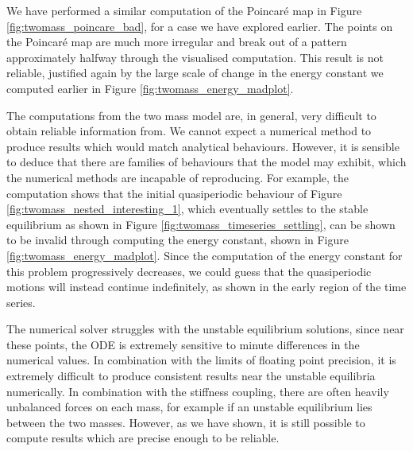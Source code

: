 \documentclass{article}
\begin{document}
We have performed a similar computation of the Poincar\'e map in Figure \ref{fig:twomass_poincare_bad},
for a case we have explored earlier.
The points on the Poincar\'e map are much more irregular and break out of a pattern approximately halfway through the visualised computation.
This result is not reliable, justified again by the large scale of change in the energy constant we computed earlier in Figure \ref{fig:twomass_energy_madplot}.

The computations from the two mass model are, in general, very difficult to obtain reliable information from.
We cannot expect a numerical method to produce results which would match analytical behaviours.
However, it is sensible to deduce that there are families of behaviours that the model may exhibit,
which the numerical methods are incapable of reproducing.
For example, the computation shows that the initial quasiperiodic behaviour of Figure \ref{fig:twomass_nested_interesting_1},
which eventually settles to the stable equilibrium as shown in Figure \ref{fig:twomass_timeseries_settling},
can be shown to be invalid through computing the energy constant, shown in Figure \ref{fig:twomass_energy_madplot}.
Since the computation of the energy constant for this problem progressively decreases,
we could guess that the quasiperiodic motions will instead continue indefinitely, as shown in the early region of the time series.

The numerical solver struggles with the unstable equilibrium solutions,
since near these points, the ODE is extremely sensitive to minute differences in the numerical values.
In combination with the limits of floating point precision,
it is extremely difficult to produce consistent results near the unstable equilibria numerically.
In combination with the stiffness coupling, there are often heavily unbalanced forces on each mass,
for example if an unstable equilibrium lies between the two masses.
However, as we have shown, it is still possible to compute results which are precise enough to be reliable.

\end{document}
